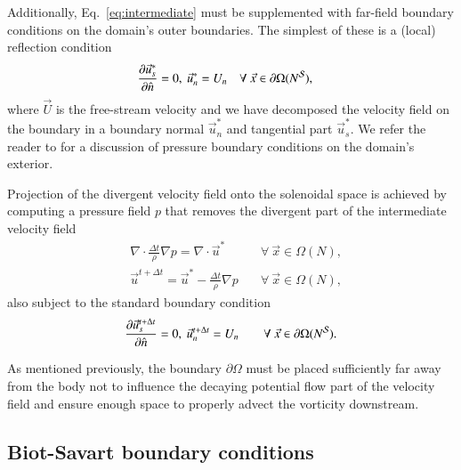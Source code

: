\documentclass[final,1p,times]{elsarticle}
\begin{document}
Additionally, Eq.~\eqref{eq:intermediate} must be supplemented with far-field boundary conditions on the domain's outer boundaries. The simplest of these is a (local) reflection condition
\begin{align}\label{eq:BC_1}
    \frac{\partial \vec{u}^*_s}{\partial \hat{n}} = 0,\ \vec{u}^*_n = U_n &\quad\forall\ \vec{x}\in\partial\Omega (N^{\cal S}),
\end{align}
where $\vec U$ is the free-stream velocity and we have decomposed the velocity field on the boundary in a boundary normal $\vec{u}^*_n$ and tangential part $\vec{u}^*_s$. We refer the reader to \cite{Gresho1987} for a discussion of pressure boundary conditions on the domain's exterior.

Projection of the divergent velocity field onto the solenoidal space is achieved by computing a pressure field $p$ that removes the divergent part of the intermediate velocity field
\begin{align}\label{eq:poisson}
      &\nabla\cdot\frac{\Delta t}{\rho}\nabla p = \nabla\cdot \vec{u}^* &\quad\forall\ \vec{x}\in\Omega (N),\\
      \label{eq:project}
      &\vec{u}^{t+\Delta t} = \vec{u}^*-\frac{\Delta t}{\rho}\nabla p &\quad\forall\ \vec{x}\in\Omega (N),
\end{align}
also subject to the standard boundary condition
\begin{align}\label{eq:BC_2}
      &\frac{\partial \vec{u}^{t+\Delta t}_s}{\partial \hat{n}} = 0,\ \vec{u}^{t+\Delta t}_n = U_n &\quad\forall\ \vec{x}\in\partial\Omega (N^{\cal S}).
\end{align}

As mentioned previously, the boundary $\partial\Omega$ must be placed sufficiently far away from the body not to influence the decaying potential flow part of the velocity field and ensure enough space to properly advect the vorticity downstream. 

\subsection{Biot-Savart boundary conditions}
\end{document}

